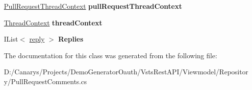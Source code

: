 \begin{DoxyCompactItemize}
\mbox{\hyperlink{class_vsts_rest_a_p_i_1_1_viewmodel_1_1_repository_1_1_pull_request_comments_1_1_pull_request_thread_context}{Pull\+Request\+Thread\+Context}} {\bfseries pull\+Request\+Thread\+Context}
\item 
\mbox{\label{class_vsts_rest_a_p_i_1_1_viewmodel_1_1_repository_1_1_pull_request_comments_1_1_value_afbab8e16de0af5199c0d0c9581a65080}} 
\mbox{\hyperlink{class_vsts_rest_a_p_i_1_1_viewmodel_1_1_repository_1_1_pull_request_comments_1_1_thread_context}{Thread\+Context}} {\bfseries thread\+Context}
\item 
\mbox{\label{class_vsts_rest_a_p_i_1_1_viewmodel_1_1_repository_1_1_pull_request_comments_1_1_value_a5522652389a138760b522fca2e814b95}} 
I\+List$<$ \mbox{\hyperlink{class_vsts_rest_a_p_i_1_1_viewmodel_1_1_repository_1_1_pull_request_comments_1_1reply}{reply}} $>$ {\bfseries Replies}
\end{DoxyCompactItemize}


The documentation for this class was generated from the following file\+:\begin{DoxyCompactItemize}
\item 
D\+:/\+Canarys/\+Projects/\+Demo\+Generator\+Oauth/\+Vsts\+Rest\+A\+P\+I/\+Viewmodel/\+Repository/Pull\+Request\+Comments.\+cs\end{DoxyCompactItemize}
